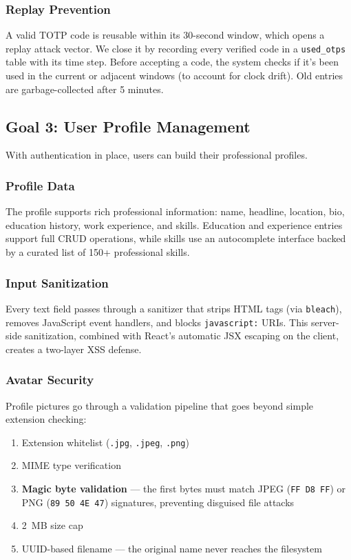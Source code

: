 \subsubsection{Replay Prevention}

A valid TOTP code is reusable within its 30-second window, which opens a replay attack vector. We close it by recording every verified code in a \texttt{used\_otps} table with its time step. Before accepting a code, the system checks if it's been used in the current or adjacent windows (to account for clock drift). Old entries are garbage-collected after 5 minutes.

\subsection{Goal 3: User Profile Management}

With authentication in place, users can build their professional profiles.

\subsubsection{Profile Data}

The profile supports rich professional information: name, headline, location, bio, education history, work experience, and skills. Education and experience entries support full CRUD operations, while skills use an autocomplete interface backed by a curated list of 150+ professional skills.

\subsubsection{Input Sanitization}

Every text field passes through a sanitizer that strips HTML tags (via \texttt{bleach}), removes JavaScript event handlers, and blocks \texttt{javascript:} URIs. This server-side sanitization, combined with React's automatic JSX escaping on the client, creates a two-layer XSS defense.

\subsubsection{Avatar Security}

Profile pictures go through a validation pipeline that goes beyond simple extension checking:

\begin{enumerate}
    \item Extension whitelist (\texttt{.jpg}, \texttt{.jpeg}, \texttt{.png})
    \item MIME type verification
    \item \textbf{Magic byte validation} — the first bytes must match JPEG (\texttt{FF D8 FF}) or PNG (\texttt{89 50 4E 47}) signatures, preventing disguised file attacks
    \item 2~MB size cap
    \item UUID-based filename — the original name never reaches the filesystem
\end{enumerate}

